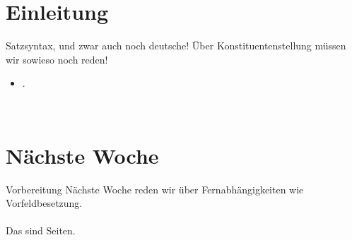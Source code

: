 \section{Einleitung}

\begin{frame}
  {Satzsyntax, und zwar auch noch deutsche!}
  \onslide<+->
  \onslide<+->
  Über Konstituentenstellung müssen wir sowieso noch reden!\\
  \Zeile
  \begin{itemize}[<+->]
    \item .
  \end{itemize}
  \Zeile
  \onslide<+->
  \centering 
  \\
\end{frame}

\section{Nächste Woche}

\begin{frame}
  {Vorbereitung}
  \onslide<+->
  \onslide<+->
  \centering 
  \large
  Nächste Woche reden wir über Fernabhängigkeiten wie Vorfeldbesetzung.\\
  \onslide<+->
  \Zeile
  \\
  \onslide<+->
  \Viertelzeile
  Das sind  Seiten.\\
\end{frame}
